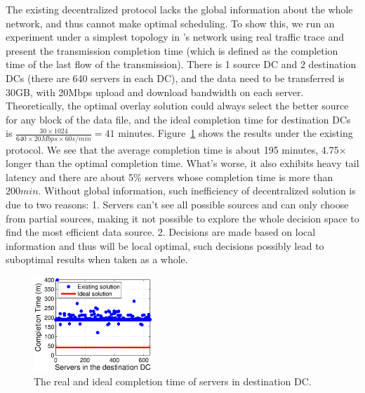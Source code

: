 The existing decentralized protocol lacks the global information
about the whole network, and thus cannot make optimal scheduling.
To show this, we run an experiment under a simplest topology in \name's network using real traffic trace and present the transmission completion time (which is defined as the completion time of the last flow of the transmission).
There is 1 source DC and 2 destination DCs
(there are 640 servers in each DC), and the data need to be transferred is 30GB, with 20Mbps upload and download
bandwidth on each server.
Theoretically, the optimal overlay solution could always select
the better source for any block of the data file, and the ideal
completion time for destination DCs is
$\frac{30\times 1024}{640\times 20Mbps \times 60s/min} = 41$
minutes.
Figure~\ref{fig:motivation} shows the results under the existing
protocol. We see that the average completion time is about
195 minutes, 4.75$\times$ longer than the optimal completion time.
What's worse, it also exhibits heavy tail latency and there are
about 5\% servers whose completion time is more than $200min$. Without global information, such inefficiency of decentralized solution is due to two reasons: 1. Servers can't see all possible sources and can only choose from partial sources, making it not possible to explore the whole decision space to find the most efficient data source. 2. Decisions are made based on local information and thus will be local optimal, such decisions possibly lead to suboptimal results when taken as a whole.%


\begin{figure}[t]
  \centering
  \includegraphics[width=45mm]{images/SEvsIdeal.eps}
  \caption{The real and ideal completion time of servers in destination DC.}
  \label{fig:motivation}
\vspace{-0.4cm}
\end{figure}


